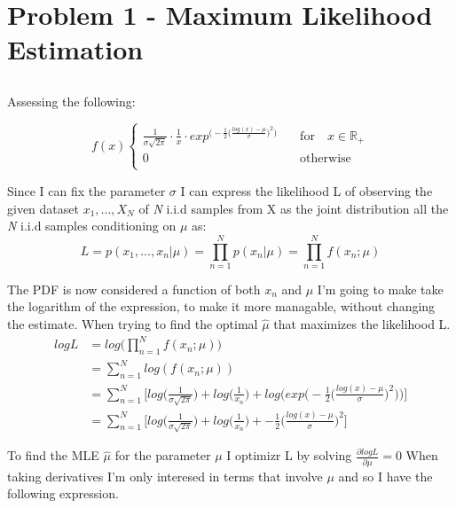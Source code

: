 \section{Problem 1 - Maximum Likelihood Estimation}
\subsection{}

Assessing the following:

\[f(x) \begin{cases}
    \frac{1}{\sigma \sqrt{2\pi}} \cdot \frac{1}{x} \cdot exp^{\Bigg( -\frac{1}{2} \Bigg(\frac{log(x) - \mu}{\sigma} \Bigg)^2 \Bigg) } & \quad \text{for} \quad x \in \mathbb{R}_+ \\
    0 & \quad \text{otherwise} \\
 \end{cases}
\]

Since I can fix the parameter $\sigma$ I can express the likelihood L of observing the given dataset $x_1, ... , X_N$ of \textit{N}
i.i.d samples from X as the joint distribution all the \textit{N} i.i.d samples conditioning on $\mu$ as:
$$ L = p (x_1, ..., x_n | \mu) = \prod_{n=1}^{N} p(x_n | \mu) = \prod_{n=1}^{N} f(x_n ; \mu) $$

The PDF is now considered a function of both $x_n$ and $\mu$
I'm going to make take the logarithm of the expression, to make it more managable, without changing the estimate. When trying to
find the optimal $\hat{\mu}$ that maximizes the likelihood L. 
\begin{align*}
    log L & = log \bigg( \prod_{n=1}^{N} f(x_n ; \mu) \Bigg) \\
          & = \sum_{n = 1}^{N} log(f(x_n ; \mu)) \\
          & = \sum_{n = 1}^{N} \Bigg[ log \Bigg(\frac{1}{\sigma \sqrt{2\pi}} \Bigg) + log \Bigg( \frac{1}{x_n} \Bigg) + log \Bigg( exp\Bigg( -\frac{1}{2} \Bigg(\frac{log(x) - \mu}{\sigma} \Bigg)^2 \Bigg)  \Bigg) \Bigg] \\
          & = \sum_{n = 1}^{N} \Bigg[ log \Bigg(\frac{1}{\sigma \sqrt{2\pi}} \Bigg) + log \Bigg( \frac{1}{x_n} \Bigg) +  -\frac{1}{2} \Bigg( \frac{log(x) - \mu}{\sigma} \Bigg)^2 \Bigg]
\end{align*}

To find the MLE $ \hat{\mu} $ for the parameter $ \mu $ I optimizr L by solving
$ \frac{\partial logL}{\partial \mu} = 0 $
When taking derivatives I'm only interesed in terms that involve $\mu$ and so I have the following expression.

